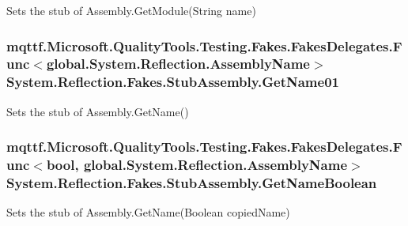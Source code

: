 Sets the stub of Assembly.\-Get\-Module(\-String name)

\hypertarget{class_system_1_1_reflection_1_1_fakes_1_1_stub_assembly_a3b3644bbaab5e8b90d55c27c2b36f299}{
\subsubsection[{Get\-Name01}]{\setlength{\rightskip}{0pt plus 5cm}mqttf.\-Microsoft.\-Quality\-Tools.\-Testing.\-Fakes.\-Fakes\-Delegates.\-Func$<$global.\-System.\-Reflection.\-Assembly\-Name$>$ System.\-Reflection.\-Fakes.\-Stub\-Assembly.\-Get\-Name01}}\label{class_system_1_1_reflection_1_1_fakes_1_1_stub_assembly_a3b3644bbaab5e8b90d55c27c2b36f299}


Sets the stub of Assembly.\-Get\-Name()

\hypertarget{class_system_1_1_reflection_1_1_fakes_1_1_stub_assembly_a33fef10eaa6dc9248dc41cee4ba59d79}{
\subsubsection[{Get\-Name\-Boolean}]{\setlength{\rightskip}{0pt plus 5cm}mqttf.\-Microsoft.\-Quality\-Tools.\-Testing.\-Fakes.\-Fakes\-Delegates.\-Func$<$bool, global.\-System.\-Reflection.\-Assembly\-Name$>$ System.\-Reflection.\-Fakes.\-Stub\-Assembly.\-Get\-Name\-Boolean}}\label{class_system_1_1_reflection_1_1_fakes_1_1_stub_assembly_a33fef10eaa6dc9248dc41cee4ba59d79}


Sets the stub of Assembly.\-Get\-Name(\-Boolean copied\-Name)

